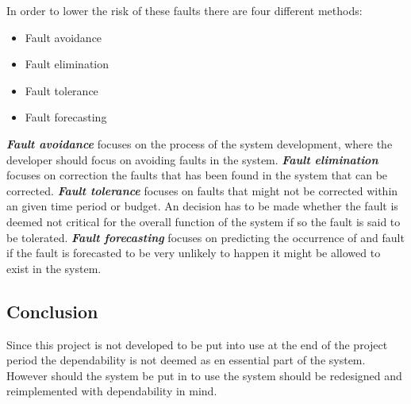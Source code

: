 In order to lower the risk of these faults there are four different methods:
\begin{itemize}
\item Fault avoidance
\item Fault elimination
\item Fault tolerance
\item Fault forecasting
\end{itemize}
\textit{\textbf{Fault avoidance}} focuses on the process of the system development, where the developer should focus on avoiding faults in the system.
\textit{\textbf{Fault elimination}} focuses on correction the faults that has been found in the system that can be corrected. 
\textit{\textbf{Fault tolerance}} focuses on faults that might not be corrected within an given time period or budget.
An decision has to be made whether the fault is deemed not critical for the overall function of the system if so the fault is said to be tolerated.
\textit{\textbf{Fault forecasting}} focuses on predicting the occurrence of and fault if the fault is forecasted to be very unlikely to happen it might be allowed to exist in the system. 

\subsection{Conclusion}
Since this project is not developed to be put into use at the end of the project period the dependability is not deemed as en essential part of the system. 
However should the system be put in to use the system should be redesigned and reimplemented with dependability in mind. 